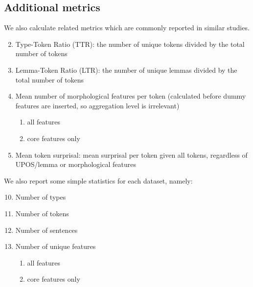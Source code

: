 \documentclass[USenglish]{article}
\begin{document}
\subsection{Additional metrics}
We also calculate related metrics which are commonly reported in similar studies.
\begin{enumerate}
  \setcounter{enumi}{1}  %
  \item Type-Token Ratio (TTR): the number of unique tokens divided by the total number of tokens
  \item Lemma-Token Ratio (LTR): the number of unique lemmas divided by the total number of tokens
  \item Mean number of morphological features per token (calculated before dummy features are inserted, so aggregation level is irrelevant)
      \begin{enumerate}
  \renewcommand{\labelenumi}{\alph{enumi})}
  \item all features
  \item core features only
 \end{enumerate}
   \item Mean token surprisal: mean surprisal per token given all tokens, regardless of UPOS/lemma or morphological features
\end{enumerate}

\noindent We also report some simple statistics for each dataset, namely:

\begin{enumerate}
  \setcounter{enumi}{9}  %
  \item Number of types
  \item Number of tokens
  \item Number of sentences
  \item Number of unique features%
      \begin{enumerate}
    \renewcommand{\labelenumi}{\alph{enumi})}
 \item  all features
  \item core features only
 \end{enumerate}
 \end{enumerate}
\end{document}
